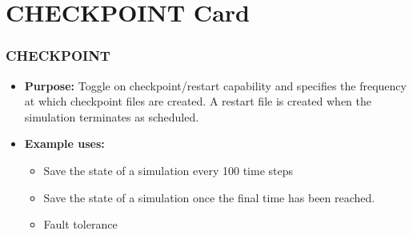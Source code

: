 \section{CHECKPOINT Card}

\begin{frame}\frametitle{CHECKPOINT}

\begin{itemize}{}
\item[] \textbf{Purpose:} Toggle on checkpoint/restart capability and specifies the frequency at which checkpoint files are created.  A restart file is created when the simulation terminates as scheduled.

\item[] \textbf{Example uses:}
\begin{itemize}
\item Save the state of a simulation every 100 time steps
\item Save the state of a simulation once the final time has been reached.  
\item Fault tolerance
\end{itemize}
\end{itemize}

\end{frame}


